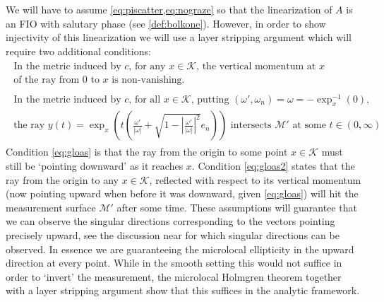 \documentclass[
	fontsize=11pt, 
	twoside=false, 
	abstract=true, 
	a4paper,
]{scrartcl}
\newcommand{\abs}[1]{\left\lvert#1\right\rvert}
\begin{document}
We will have to assume \cref{eq:piscatter,eq:nograze} so that the linearization of $A$ is an FIO with salutary phase (see \cref{def:bolkone}). However, in order to show injectivity of this linearization we will use a layer stripping argument which will require two additional conditions:
\begin{align}\label{eq:gloas}
	\begin{matrix*}\text{In the metric induced by $c$, for any $x\in\mathcal{K}$, the vertical momentum at $x$}\\
	\text{of the ray from $0$ to $x$ is non-vanishing.}%
	\end{matrix*} \tag{B1}\\
	\begin{matrix*}\text{In the metric induced by $c$, for all $x\in \mathcal{K}$, putting $(\omega',\omega_n) = \omega = -\exp_x^{-1}(0)$,}\\
		\text{the ray $y(t) = \exp_x\left(t\left(\frac{\omega'}{\abs{\omega}}+\sqrt{1-\abs{\frac{\omega'}{\abs{\omega}}}^2} e_n\right)\right)$ intersects $\mathcal{M}'$ at some $t \in(0,\infty)$}\,.
	\end{matrix*} \tag{B2}\label{eq:gloas2}
\end{align}
Condition \cref{eq:gloas} is that the ray from the origin to some point $x\in\mathcal{K}$ must still be `pointing downward' as it reaches $x$. %
Condition \cref{eq:gloas2} states that the ray from the origin to any $x\in\mathcal{K}$, reflected %
with respect to its vertical momentum (now pointing upward when before it was downward, given \cref{eq:gloas}) will %
hit the measurement surface $\mathcal{M}'$ after some time. %
These assumptions will guarantee that we can observe the singular directions corresponding to the vectors pointing precisely upward, see the discussion near \cite[Eq.~(77)]{zbMATH01725533} for which singular directions can be observed. In essence we are guaranteeing the microlocal ellipticity in the upward direction at every point. While in the smooth setting this would not suffice in order to `invert' the measurement, the microlocal Holmgren theorem together with a layer stripping argument show that this suffices in the analytic framework. 
\end{document}
